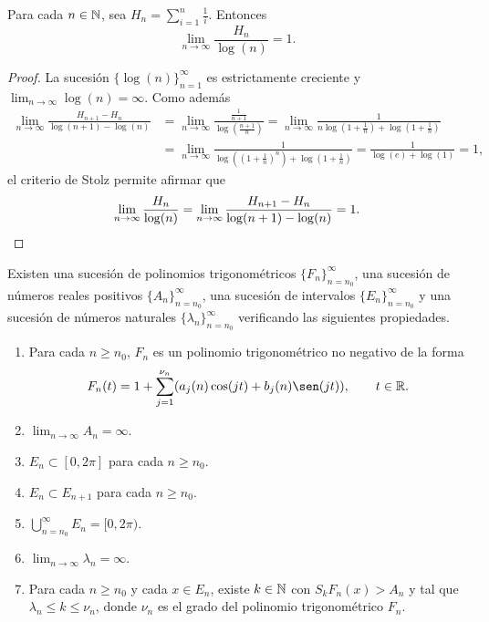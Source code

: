 \documentclass[a4paper, 12pt, oneside]{book}
\begin{document}
\begin{lemma}\label{2.2.11}
    Para cada $n \in \mathbb N$, sea $H_n = \sum_{i=1}^n \frac{1}{i}$. Entonces
    \[\lim_{n \to \infty} \frac{H_n}{\log(n)} = 1.\]
\end{lemma}

\begin{proof}
    La sucesión $\{\log(n)\}_{n=1}^\infty$ es estrictamente creciente y $\lim_{n\to\infty} \log(n) = \infty$. Como además
    \begin{align*}
        \lim_{n\to\infty}\frac{H_{n+1}-H_n}{\log(n+1)-\log(n)} &= \lim_{n\to\infty} \frac{\frac{1}{n+1}}{\log(\frac{n+1}{n})} = \lim_{n\to\infty}\frac{1}{n\log(1+\frac{1}{n})+\log(1+\frac{1}{n})} 
        \\ &= \lim_{n\to\infty}\frac{1}{\log((1+\frac{1}{n})^n)+\log(1+\frac{1}{n})} = \frac{1}{\log(e)+\log(1)} = 1,
    \end{align*}
    el criterio de Stolz permite afirmar que
    \[\lim_{n\to\infty}\frac{H_n}{\log(n)} = \lim_{n\to\infty}\frac{H_{n+1}-H_n}{\log(n+1)-\log(n)} = 1.\qedhere\]
\end{proof}

\begin{lemma}
    Existen una sucesión de polinomios trigonométricos $\{F_n\}_{n=n_0}^\infty$, una sucesión de números reales positivos $\{A_n\}_{n=n_0}^\infty$, una sucesión de intervalos $\{E_n\}_{n=n_0}^\infty$ y una sucesión de números naturales $\{\lambda_n\}_{n=n_0}^\infty$ verificando las siguientes propiedades.
    \begin{enumerate}
        \item Para cada $n \geq n_0$, $F_n$ es un polinomio trigonométrico no negativo de la forma
        \[F_n(t)=1+\sum_{j=1}^{\nu_n}(a_j(n)\cos(jt)+b_j(n)\sen(jt)), \qquad t \in \R.\]
        \item $\lim_{n \to \infty} A_n = \infty$.
        \item $E_n \subset [0,2\pi]$ para cada $n \geq n_0$.
        \item $E_n \subset E_{n+1}$ para cada $n \geq n_0$.
        \item $\bigcup_{n=n_0}^\infty E_n = [0,2\pi)$.
        \item $\lim_{n\to\infty} \lambda_n = \infty$.
        \item Para cada $n \geq n_0$ y cada $x \in E_n$, existe $k \in \mathbb N$ con $S_kF_n(x) > A_n$ y tal que $\lambda_n \leq k \leq \nu_n$, donde $\nu_n$ es el grado del polinomio trigonométrico $F_n$.
    \end{enumerate}
\end{lemma}
\end{document}
